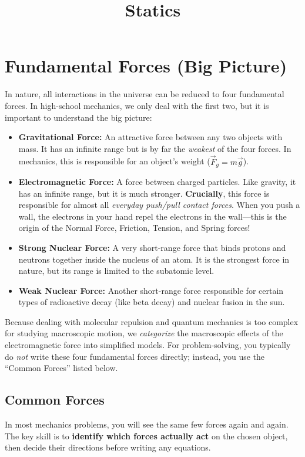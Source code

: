 \documentclass{article}
\begin{document}
\title{Statics}
\author{}
\date{}
\maketitle


\section{Fundamental Forces (Big Picture)}
In nature, all interactions in the universe can be reduced to four fundamental forces. In high-school mechanics, we only deal with the first two, but it is important to understand the big picture:
\begin{itemize}
  \item \textbf{Gravitational Force:} An attractive force between any two objects with mass. It has an infinite range but is by far the \emph{weakest} of the four forces. In mechanics, this is responsible for an object's weight ($\vec{F}_g = m\vec{g}$).
  \item \textbf{Electromagnetic Force:} A force between charged particles. Like gravity, it has an infinite range, but it is much stronger. \textbf{Crucially}, this force is responsible for almost all \emph{everyday push/pull contact forces}. When you push a wall, the electrons in your hand repel the electrons in the wall—this is the origin of the Normal Force, Friction, Tension, and Spring forces!
  \item \textbf{Strong Nuclear Force:} A very short-range force that binds protons and neutrons together inside the nucleus of an atom. It is the strongest force in nature, but its range is limited to the subatomic level.
  \item \textbf{Weak Nuclear Force:} Another short-range force responsible for certain types of radioactive decay (like beta decay) and nuclear fusion in the sun. 
\end{itemize}
Because dealing with molecular repulsion and quantum mechanics is too complex for studying macroscopic motion, we \emph{categorize} the macroscopic effects of the electromagnetic force into simplified models. For problem-solving, you typically do \emph{not} write these four fundamental forces directly; instead, you use the ``Common Forces'' listed below.
\subsection{Common Forces}
In most mechanics problems, you will see the same few forces again and again. The key skill is to \textbf{identify which forces actually act} on the chosen object, then decide their directions before writing any equations.
\end{document}
